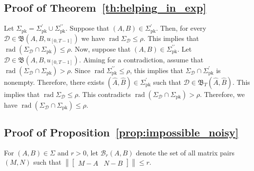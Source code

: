 \documentclass[journal,twoside,web]{ieeecolor}
\DeclareMathOperator{\rad}{rad}
\newcommand{\norm}[1]{\left\|#1\right\|}
\begin{document}
\subsection{Proof of Theorem~\ref{th:helping_in_exp}}

Let $\Sigma_\text{pk}=\Sigma_\text{pk}^\prime\cup\Sigma_\text{pk}^{\prime\prime}$. Suppose that $(A,B)\in\Sigma_\text{pk}^\prime$. Then, for every \mbox{$\mathcal{D}\in\mathfrak{B}(A,B,u_{[0,T-1]})$} we have $\rad\Sigma_\mathcal{D}\leq\rho$. This implies that $\rad(\Sigma_\mathcal{D}\cap\Sigma_\text{pk})\leq\rho$. Now, suppose that \mbox{$(A,B)\in\Sigma_\text{pk}^{\prime\prime}$}. Let $\mathcal{D}\in\mathfrak{B}(A,B,u_{[0,T-1]})$. Aiming for a contradiction, assume that $\rad(\Sigma_\mathcal{D}\cap\Sigma_\text{pk})>\rho$. Since $\rad\Sigma_\text{pk}^{\prime\prime}\leq \rho$, this implies that $\Sigma_\mathcal{D}\cap\Sigma_\text{pk}^\prime$ is nonempty. Therefore, there exists $(\hat{A},\hat{B})\in\Sigma_\text{pk}^\prime$ such that $\mathcal{D}\in\mathfrak{B}_T(\hat{A},\hat{B})$. This implies that $\rad \Sigma_\mathcal{D}\leq \rho$. This contradicts $\rad(\Sigma_\mathcal{D}\cap\Sigma_\text{pk})>\rho$. Therefore, we have $\rad(\Sigma_\mathcal{D}\cap\Sigma_\text{pk})\leq\rho$. \hfill \QED

\subsection{Proof of Proposition~\ref{prop:impossible_noisy}}

For $(A,B)\in\Sigma$ and $r>0$, let $\mathcal{B}_r(A,B)$ denote the set of all matrix pairs $(M,N)$ such that $\norm{\begin{bmatrix}
M-A & N-B
\end{bmatrix}}\leq r$. 
\end{document}
